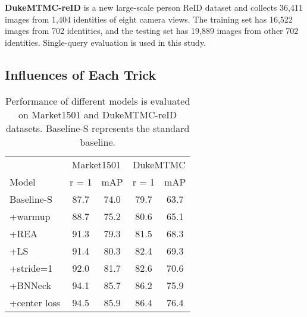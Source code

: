 \documentclass[journal]{IEEEtran}
\begin{document}
\textbf{DukeMTMC-reID}  is a new large-scale person ReID dataset and collects 36,411 images from 1,404 identities of eight camera views. The training set has 16,522 images from 702 identities, and the testing set has 19,889 images from other 702 identities. Single-query evaluation is used in this study.

\subsection{Influences of Each Trick}

\renewcommand{\multirowsetup}{\centering}
\vspace{-3mm}
\begin{table}[htb]\small
  \begin{center}
  \begin{tabular}{ l|cc|cc}
\hline
    			& \multicolumn{2}{c|}{Market1501} & \multicolumn{2}{c}{DukeMTMC}	 \\
  Model			& r = 1 	& mAP	&r = 1 	& mAP 	 \\
 	\hline
	\hline
Baseline-S		&87.7	&74.0	&79.7	&63.7			\\
+warmup         &88.7	&75.2	&80.6	&65.1           \\
+REA            &91.3	&79.3	&81.5	&68.3			\\
+LS	            &91.4	&80.3	&82.4	&69.3			\\
+stride=1	    &92.0	&81.7	&82.6	&70.6			\\
+BNNeck	        &94.1	&85.7	&86.2	&75.9		\\
+center loss    &94.5	&85.9	&86.4	&76.4		\\
\hline
  \end{tabular}
  \end{center}
  \caption{\label{ablation}Performance of different models is evaluated on Market1501 and DukeMTMC-reID datasets. Baseline-S represents the standard baseline.}
\vspace{-3mm}
\end{table}
\end{document}
